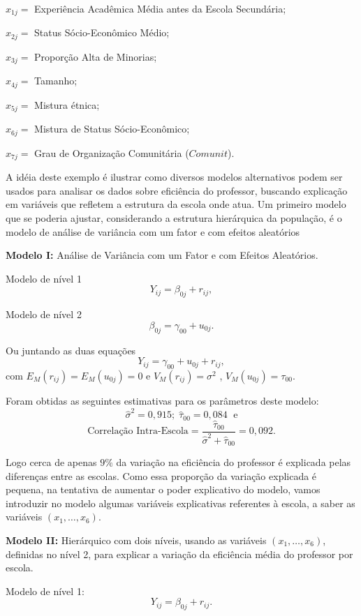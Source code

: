 \documentclass[]{book}
\numberwithin{example}{chapter}
\numberwithin{remark}{chapter}
\numberwithin{definition}{chapter}
\begin{document}
\(x_{1j}=\) Experiência Acadêmica Média antes da Escola Secundária;

\(x_{2j}=\) Status Sócio-Econômico Médio;

\(x_{3j}=\) Proporção Alta de Minorias;

\(x_{4j}=\) Tamanho;

\(x_{5j}=\) Mistura étnica;

\(x_{6j}=\) Mistura de Status Sócio-Econômico;

\(x_{7j}=\) Grau de Organização Comunitária (\(Comunit\)).

A idéia deste exemplo é ilustrar como diversos modelos alternativos
podem ser usados para analisar os dados sobre eficiência do professor,
buscando explicação em variáveis que refletem a estrutura da escola onde
atua. Um primeiro modelo que se poderia ajustar, considerando a
estrutura hierárquica da população, é o modelo de análise de variância
com um fator e com efeitos aleatórios

\textbf{Modelo I: }Análise de Variância com um Fator e com Efeitos
Aleatórios.

Modelo de nível 1 \[
Y_{ij}=\beta _{0j}+r_{ij},
\]

Modelo de nível 2 \[
\beta _{0j}=\gamma _{00}+u_{0j}.
\]

Ou juntando as duas equações \[
Y_{ij}=\gamma _{00}+u_{0j}+r_{ij},
\] com \(E_{M}\left( r_{ij}\right) =E_{M}\left( u_{0j}\right) =0\) e
\(V_{M}\left( r_{ij}\right) =\sigma ^{2}\) ,
\(V_{M}\left( u_{0j}\right) =\tau _{00}\).

Foram obtidas as seguintes estimativas para os parâmetros deste modelo:
\[
\hat{\sigma}^{2}=0,915;\;\hat{\tau}_{00}=0,084\;\mbox{ e}
\] \[
\mbox{Correlação Intra-Escola}=\frac{\hat{\tau}_{00}}{\hat{
\sigma}^{2}+\hat{\tau}_{00}}=0,092.
\]

Logo cerca de apenas \(9\%\) da variação na eficiência do professor é
explicada pelas diferenças entre as escolas. Como essa proporção da
variação explicada é pequena, na tentativa de aumentar o poder
explicativo do modelo, vamos introduzir no modelo algumas variáveis
explicativas referentes à escola, a saber as variáveis
\(\left( x_{1},\ldots ,x_{6}\right)\).

\textbf{Modelo II:} Hierárquico com dois níveis, usando as variáveis
\(\left( x_{1},\ldots ,x_{6}\right)\), definidas no nível 2, para
explicar a variação da eficiência média do professor por escola.

Modelo de nível 1: \[
Y_{ij}=\beta _{0j}+r_{ij}.
\]
\end{document}
